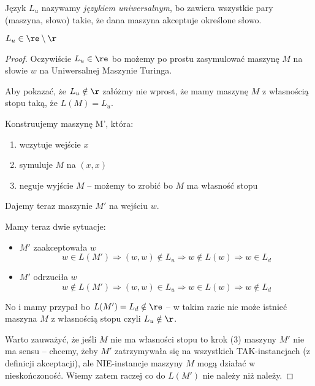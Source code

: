 Język \(L_u\) nazywamy \textit{językiem uniwersalnym}, bo zawiera wszystkie pary (maszyna, słowo) takie, że dana maszyna akceptuje określone słowo. 

\begin{theorem}
    \( L_u \in \re \setminus \r \)
\end{theorem}
\begin{proof}
    Oczywiście \( L_u \in \re \) bo możemy po prostu zasymulować maszynę \( M \) na słowie \( w \) na Uniwersalnej Maszynie Turinga.
    
    Aby pokazać, że \( L_u \notin \r \) załóżmy nie wprost, że mamy maszynę \( M \) z własnością stopu taką, że \( L(M) = L_u \).
    
    Konstruujemy maszynę M', która:
    \begin{enumerate}
        \item wczytuje wejście \( x \) 
        \item symuluje \( M \) na \( (x, x) \)
        \item neguje wyjście \( M \) -- możemy to zrobić bo \( M \) ma własność stopu
    \end{enumerate}
    
    Dajemy teraz maszynie \( M' \) na wejściu \( w \).
    
    Mamy teraz dwie sytuacje:
    \begin{itemize}
        \item \( M' \) zaakceptowała \( w \)
        \[
            w \in L(M') \Rightarrow (w, w) \notin L_u \Rightarrow w \notin L(w) \Rightarrow w \in L_d
        \]
        
        \item \( M' \) odrzuciła \( w \)
        \[
            w \notin L(M') \Rightarrow (w, w) \in L_u \Rightarrow w \in L(w)
            \Rightarrow w \notin L_d
        \]
    \end{itemize}
    No i mamy przypał bo \( L(M') = L_d \notin \re \) -- w takim razie nie może istnieć maszyna \( M \) z własnością stopu czyli \( L_u \notin \r \).
    
    Warto zauważyć, że jeśli \( M \) nie ma własności stopu to krok (3) maszyny \( M' \) nie ma sensu -- chcemy, żeby \( M' \) zatrzymywała się na wszystkich TAK-instancjach (z definicji akceptacji), ale NIE-instancje maszyny \( M \) mogą działać w nieskończoność. Wiemy zatem raczej co do \( L(M') \) nie należy niż należy.
    
\end{proof}